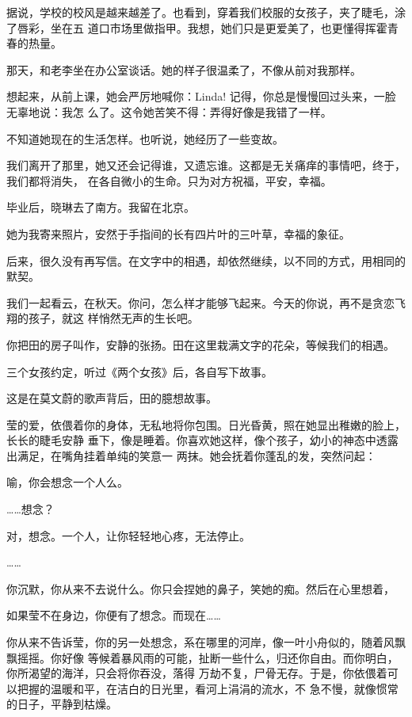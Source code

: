 \documentclass[12pt,a4paper]{article}
\def\blankrev{\vspace{1ex}}									%
\begin{document}
		据说，学校的校风是越来越差了。也看到，穿着我们校服的女孩子，夹了睫毛，涂了唇彩，坐在五
	道口市场里做指甲。我想，她们只是更爱美了，也更懂得挥霍青春的热量。


		那天，和老李坐在办公室谈话。她的样子很温柔了，不像从前对我那样。

		想起来，从前上课，她会严厉地喊你：Linda! 记得，你总是慢慢回过头来，一脸无辜地说：我怎
	么了。这令她苦笑不得：弄得好像是我错了一样。

		不知道她现在的生活怎样。也听说，她经历了一些变故。

		我们离开了那里，她又还会记得谁，又遗忘谁。这都是无关痛痒的事情吧，终于，我们都将消失，
	在各自微小的生命。只为对方祝福，平安，幸福。


		毕业后，晓琳去了南方。我留在北京。

		她为我寄来照片，安然于手指间的长有四片叶的三叶草，幸福的象征。

		后来，很久没有再写信。在文字中的相遇，却依然继续，以不同的方式，用相同的默契。


		我们一起看云，在秋天。你问，怎么样才能够飞起来。今天的你说，再不是贪恋飞翔的孩子，就这
	样悄然无声的生长吧。


		你把田的房子叫作，安静的张扬。田在这里栽满文字的花朵，等候我们的相遇。

	\endwriting



		三个女孩约定，听过《两个女孩》后，各自写下故事。

		这是在莫文蔚的歌声背后，田的臆想故事。

		\blankrev
		莹的爱，依偎着你的身体，无私地将你包围。日光昏黄，照在她显出稚嫩的脸上，长长的睫毛安静
	垂下，像是睡着。你喜欢她这样，像个孩子，幼小的神态中透露出满足，在嘴角挂着单纯的笑意一
	两抹。她会抚着你蓬乱的发，突然问起：

		喻，你会想念一个人么。

		……想念？

		对，想念。一个人，让你轻轻地心疼，无法停止。

		……

		你沉默，你从来不去说什么。你只会捏她的鼻子，笑她的痴。然后在心里想着，


		如果莹不在身边，你便有了想念。而现在……


		你从来不告诉莹，你的另一处想念，系在哪里的河岸，像一叶小舟似的，随着风飘飘摇摇。你好像
	等候着暴风雨的可能，扯断一些什么，归还你自由。而你明白，你所渴望的海洋，只会将你吞没，落得
	万劫不复，尸骨无存。于是，你依偎着可以把握的温暖和平，在洁白的日光里，看河上涓涓的流水，不
	急不慢，就像惯常的日子，平静到枯燥。
\end{document}
